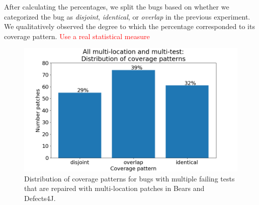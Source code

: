 \documentclass[10pt, conference]{IEEEtran}
\newcommand\todo[1]{\textcolor{red}{#1}}
\begin{document}
After calculating the percentages, we split the bugs based on whether we categorized the bug 
as \emph{disjoint}, \emph{identical}, or \emph{overlap} in the previous experiment.
We qualitatively observed the degree to which the percentage corresponded to its coverage 
pattern. \todo{Use a real statistical measure}

\begin{figure}
	\includegraphics[width=\linewidth]{img/coverage-all.png}
	\caption{Distribution of coverage patterns for bugs with multiple failing
      tests that are repaired with multi-location patches in Bears and Defects4J.}
	\label{fig:coverage-all}
\end{figure}
\end{document}
